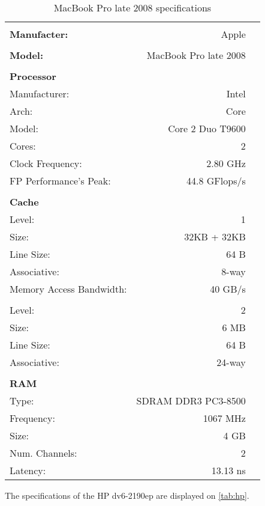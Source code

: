 \documentclass[a4paper,10pt,openright,openbib]{article}
\begin{document}
\begin{table}[!htp]
		\begin{tabular}{lrl}
			\hline \\
			\textbf{Manufacter:} & Apple \\
			\hline \\
			\textbf{Model:} & MacBook Pro late 2008 \\
			\hline \\
			\textbf{Processor} & & \\
			Manufacturer: & Intel & \\
			Arch: & Core & \\
			Model: & Core 2 Duo T9600 & \\
			Cores: & 2 & \\
			Clock Frequency: & 2.80 GHz & \\
			FP Performance's Peak: & 44.8 GFlops/s & \\
			\hline \\
			\textbf{Cache} & & \\
			Level: & 1 & \\
			Size: & 32KB + 32KB & \\
			Line Size: & 64 B & \\
			Associative: & 8-way & \\
			Memory Access Bandwidth: & 40 GB/s & \\
			\\
			Level: & 2 & \\
			Size: & 6 MB & \\
			Line Size: & 64 B & \\
			Associative: & 24-way & \\
			\hline \\
			\textbf{RAM} \\
			Type: & SDRAM DDR3 PC3-8500 & \\
			Frequency: & 1067 MHz & \\
			Size: & 4 GB & \\
			Num. Channels: & 2 & \\
			Latency: & 13.13 ns & \\
		\end{tabular}
		\caption{MacBook Pro late 2008 specifications}
		\label{tab:mbp}
\end{table}
The specifications of the HP dv6-2190ep are displayed on \autoref{tab:hp}. \\
\end{document}
